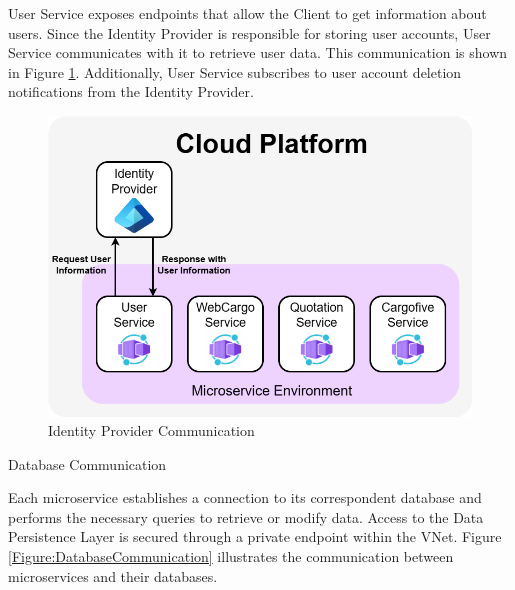 \documentclass[12pt, reqno]{amsbook}
\makeatletter
\def\subsection{\@startsection{subsection}{2}%
      \z@{.5\linespacing\@plus.7\linespacing}{.25\linespacing}%
      {\normalfont\bfseries\flushleft}}
\theoremstyle{definition}
\theoremstyle{definition}
\numberwithin{section}{chapter}
\numberwithin{table}{chapter}
\numberwithin{figure}{chapter}
\makeatother
\begin{document}
User Service exposes endpoints that allow the Client to get information about users. Since the Identity Provider is responsible for storing user accounts, User Service communicates with it to retrieve user data. This communication is shown in Figure \ref{Figure:IdentityProviderCommunication}. Additionally, User Service subscribes to user account deletion notifications from the Identity Provider.

\begin{figure}[H]
  \centering
  \includegraphics[width=0.9\linewidth]{images/IdentityProviderCommunication.png}
  \caption{\label{Figure:IdentityProviderCommunication}Identity Provider Communication}
\end{figure}

\subsection{Database Communication}

Each microservice establishes a connection to its correspondent database and performs the necessary queries to retrieve or modify data. Access to the Data Persistence Layer is secured through a private endpoint within the VNet. Figure \ref{Figure:DatabaseCommunication} illustrates the communication between microservices and their databases.
\end{document}
